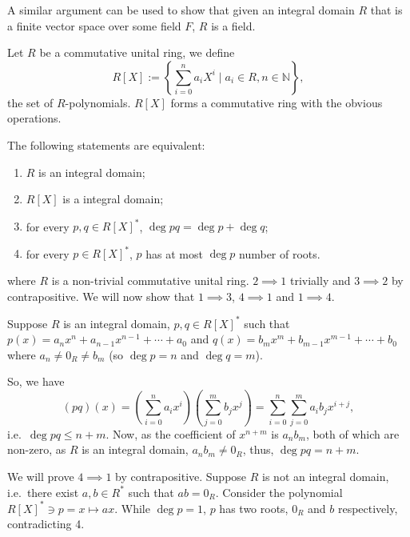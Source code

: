 \documentclass[
]{article}
\begin{document}
A similar argument can be used to show that given an integral domain
\(R\) that is a finite vector space over some field \(F\), \(R\) is a
field.

Let \(R\) be a commutative unital ring, we define \[
  R[X] := \left\{ \sum_{i = 0}^n a_i X^i \mid a_i \in R, n \in \mathbb{N} \right\},
\] the set of \(R\)-polynomials. \(R[X]\) forms a commutative ring with
the obvious operations.

The following statements are equivalent:

\begin{enumerate} 
  \item \(R\) is an integral domain;
  \item \(R[X]\) is a integral domain;
  \item for every \(p, q \in R[X]^*\), \(\deg pq = \deg p + \deg q\);
  \item for every \(p \in R[X]^*\), \(p\) has at most \(\deg p\) number of roots.
\end{enumerate}

where \(R\) is a non-trivial commutative unital ring. \proof
\(2 \implies 1\) trivially and \(3 \implies 2\) by contrapositive. We
will now show that \(1 \implies 3\), \(4 \implies 1\) and
\(1 \implies 4\).

Suppose \(R\) is an integral domain, \(p, q \in R[X]^*\) such that
\(p(x) = a_n x^n + a_{n - 1} x^{n - 1} + \cdots + a_0\) and
\(q(x) = b_m x^m + b_{m - 1} x^{m - 1} + \cdots + b_0\) where
\(a_n \neq 0_R \neq b_m\) (so \(\deg p = n\) and \(\deg q = m\)).

So, we have \[(pq)(x) = \left(\sum_{i = 0}^n a_i x^i\right) 
              \left(\sum_{j = 0}^m b_j x^j\right)
            = \sum_{i = 0}^n \sum_{j = 0}^m a_i b_j x^{i + j},\]
i.e.~\(\deg pq \le n + m\). Now, as the coefficient of \(x^{n + m}\) is
\(a_n b_m\), both of which are non-zero, as \(R\) is an integral domain,
\(a_n b_m \neq 0_R\), thus, \(\deg pq = n + m\).

We will prove \(4 \implies 1\) by contrapositive. Suppose \(R\) is not
an integral domain, i.e.~there exist \(a, b \in R^*\) such that
\(ab = 0_R\). Consider the polynomial \(R[X]^* \ni p = x \mapsto ax\).
While \(\deg p = 1\), \(p\) has two roots, \(0_R\) and \(b\)
respectively, contradicting 4.
\end{document}

